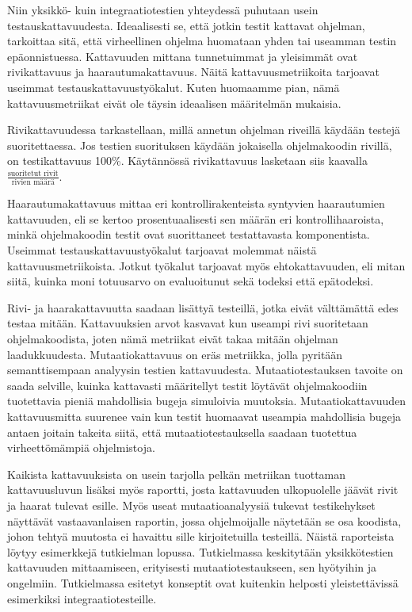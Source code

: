 \documentclass[finnish]{tktltiki2}
\begin{document}
Niin yksikkö- kuin integraatiotestien yhteydessä puhutaan usein testauskattavuudesta. Ideaalisesti se, että jotkin testit kattavat ohjelman, tarkoittaa sitä, että virheellinen ohjelma huomataan yhden tai useamman testin epäonnistuessa. Kattavuuden mittana tunnetuimmat ja yleisimmät ovat rivikattavuus ja haarautumakattavuus. Näitä kattavuusmetriikoita tarjoavat useimmat testauskattavuustyökalut. Kuten huomaamme pian, nämä kattavuusmetriikat eivät ole täysin ideaalisen määritelmän mukaisia.

Rivikattavuudessa tarkastellaan, millä annetun ohjelman riveillä käydään testejä suoritettaessa. Jos testien suorituksen käydään jokaisella ohjelmakoodin rivillä, on testikattavuus 100\%. Käytännössä rivikattavuus lasketaan siis kaavalla $\frac{\text{suoritetut rivit}}{\text{rivien määrä}}$.

Haarautumakattavuus mittaa eri kontrollirakenteista syntyvien haarautumien kattavuuden, eli se kertoo prosentuaalisesti sen määrän eri kontrollihaaroista, minkä ohjelmakoodin testit ovat suorittaneet testattavasta komponentista. Useimmat testauskattavuustyökalut tarjoavat molemmat näistä kattavuusmetriikoista. Jotkut työkalut tarjoavat myös ehtokattavuuden, eli mitan siitä, kuinka moni totuusarvo on evaluoitunut sekä todeksi että epätodeksi.

Rivi- ja haarakattavuutta saadaan lisättyä testeillä, jotka eivät välttämättä edes testaa mitään. Kattavuuksien arvot kasvavat kun useampi rivi suoritetaan ohjelmakoodista, joten nämä metriikat eivät takaa mitään ohjelman laadukkuudesta. Mutaatiokattavuus on eräs metriikka, jolla pyritään semanttisempaan analyysin testien kattavuudesta. Mutaatiotestauksen tavoite on saada selville, kuinka kattavasti määritellyt testit löytävät ohjelmakoodiin tuotettavia pieniä mahdollisia bugeja simuloivia muutoksia. Mutaatiokattavuuden kattavuusmitta suurenee vain kun testit huomaavat useampia mahdollisia bugeja antaen joitain takeita siitä, että mutaatiotestauksella saadaan tuotettua virheettömämpiä ohjelmistoja.

Kaikista kattavuuksista on usein tarjolla pelkän metriikan tuottaman kattavuusluvun lisäksi myös raportti, josta kattavuuden ulkopuolelle jäävät rivit ja haarat tulevat esille. Myös useat mutaatioanalyysiä tukevat testikehykset näyttävät vastaavanlaisen raportin, jossa ohjelmoijalle näytetään se osa koodista, johon tehtyä muutosta ei havaittu sille kirjoitetuilla testeillä. Näistä raporteista löytyy esimerkkejä tutkielman lopussa. Tutkielmassa keskitytään yksikkötestien kattavuuden mittaamiseen, erityisesti mutaatiotestaukseen, sen hyötyihin ja ongelmiin. Tutkielmassa esitetyt konseptit ovat kuitenkin helposti yleistettävissä esimerkiksi integraatiotesteille.
\end{document}
